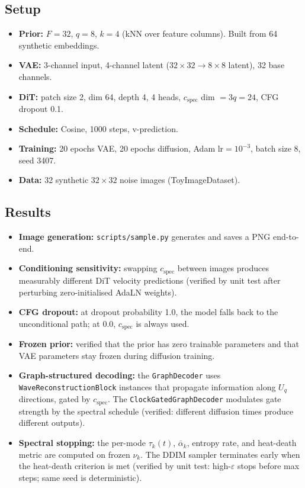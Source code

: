 \documentclass[11pt]{article}
\begin{document}
    \subsection{Setup}
    \label{sec:setup}
    \begin{itemize}[leftmargin=1.5em]
    \item \textbf{Prior:} $F=32$, $q=8$, $k=4$ (kNN over feature
        columns). Built from 64 synthetic embeddings.
    \item \textbf{VAE:} 3-channel input, 4-channel latent
        ($32\times32 \to 8\times8$ latent), 32 base channels.
    \item \textbf{DiT:} patch size 2, dim 64, depth 4, 4 heads,
        $c_{\mathrm{spec}}$ dim $= 3q = 24$, CFG dropout 0.1.
    \item \textbf{Schedule:} Cosine, 1000 steps, v-prediction.
    \item \textbf{Training:} 20 epochs VAE, 20 epochs diffusion,
        Adam lr$=10^{-3}$, batch size 8, seed 3407.
    \item \textbf{Data:} 32 synthetic $32\times32$ noise images
        (ToyImageDataset).
    \end{itemize}

    \subsection{Results}
    \label{sec:results}
    \begin{itemize}[leftmargin=1.5em]
    \item \textbf{Image generation:} \texttt{scripts/sample.py}
        generates and saves a PNG end-to-end.
    \item \textbf{Conditioning sensitivity:} swapping
        $c_{\mathrm{spec}}$ between images produces measurably
        different DiT velocity predictions (verified by unit test
        after perturbing zero-initialised AdaLN weights).
    \item \textbf{CFG dropout:} at dropout probability 1.0, the model
        falls back to the unconditional path; at 0.0, $c_{\mathrm{spec}}$
        is always used.
    \item \textbf{Frozen prior:} verified that the prior has zero
        trainable parameters and that VAE parameters stay frozen
        during diffusion training.
    \item \textbf{Graph-structured decoding:} the \texttt{GraphDecoder}
        uses \texttt{WaveReconstructionBlock} instances that propagate
        information along $U_q$ directions, gated by $c_{\mathrm{spec}}$.
        The \texttt{ClockGatedGraphDecoder} modulates gate strength by
        the spectral schedule (verified: different diffusion times
        produce different outputs).
    \item \textbf{Spectral stopping:} the per-mode $\tau_k(t)$,
        $\bar\alpha_k$, entropy rate, and heat-death metric are
        computed on frozen $\nu_k$. The DDIM sampler terminates early
        when the heat-death criterion is met (verified by unit test:
        high-$\varepsilon$ stops before max steps; same seed is
        deterministic).
    \end{itemize}
\end{document}
